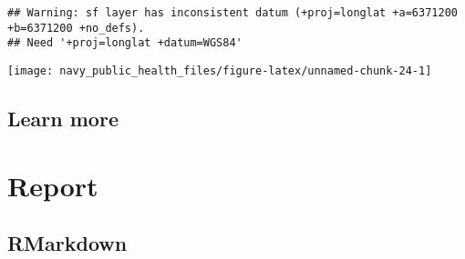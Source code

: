 \documentclass[]{tufte-book}
\newenvironment{Shaded}{}{}
\newcommand{\DataTypeTok}[1]{\textcolor[rgb]{0.56,0.13,0.00}{#1}}
\newcommand{\DecValTok}[1]{\textcolor[rgb]{0.25,0.63,0.44}{#1}}
\newcommand{\FloatTok}[1]{\textcolor[rgb]{0.25,0.63,0.44}{#1}}
\newcommand{\KeywordTok}[1]{\textcolor[rgb]{0.00,0.44,0.13}{\textbf{#1}}}
\newcommand{\NormalTok}[1]{#1}
\newcommand{\OperatorTok}[1]{\textcolor[rgb]{0.40,0.40,0.40}{#1}}
\newcommand{\StringTok}[1]{\textcolor[rgb]{0.25,0.44,0.63}{#1}}
\begin{document}
\begin{Shaded}
\end{Shaded}

\begin{verbatim}
## Warning: sf layer has inconsistent datum (+proj=longlat +a=6371200 +b=6371200 +no_defs).
## Need '+proj=longlat +datum=WGS84'
\end{verbatim}

\texttt{[image: navy\_public\_health\_files/figure-latex/unnamed-chunk-24-1]}

\hypertarget{learn-more-2}{%
\section{Learn more}\label{learn-more-2}}

\hypertarget{report}{%
\chapter{Report}\label{report}}

\hypertarget{rmarkdown}{%
\section{RMarkdown}\label{rmarkdown}}
\end{document}

